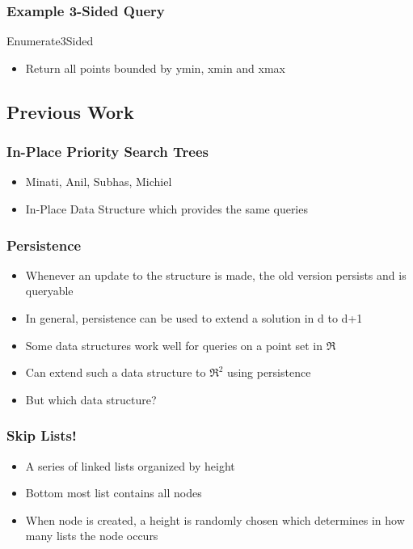 \documentclass{beamer}
\begin{document}
\begin{frame}
  \frametitle{Example 3-Sided Query}

    Enumerate3Sided

  \begin{itemize}
  \item
    Return all points bounded by ymin, xmin and xmax
  \end{itemize}

\end{frame}

\subsection{Previous Work}

\begin{frame}
  \frametitle{In-Place Priority Search Trees}

  \begin{itemize}
  \item
    Minati, Anil, Subhas, Michiel
  \item
    In-Place Data Structure which provides the same queries
  \end{itemize}

\end{frame}

\begin{frame}
  \frametitle{Persistence}

  \begin{itemize}
  \item
    Whenever an update to the structure is made, the old version persists
    and is queryable
  \item
    In general, persistence can be used to extend a solution in d to d+1
  \item
    Some data structures work well for queries on a point set in $\Re$
  \item
    Can extend such a data structure to $\Re^2$ using persistence
  \item
    But which data structure?
  \end{itemize}

\end{frame}

\begin{frame}
  \frametitle{Skip Lists!}

  \begin{itemize}
  \item
    A series of linked lists organized by height
  \item
    Bottom most list contains all nodes
  \item
    When node is created, a height is randomly chosen which determines in
    how many lists the node occurs
  \end{itemize}

\end{frame}
\end{document}

